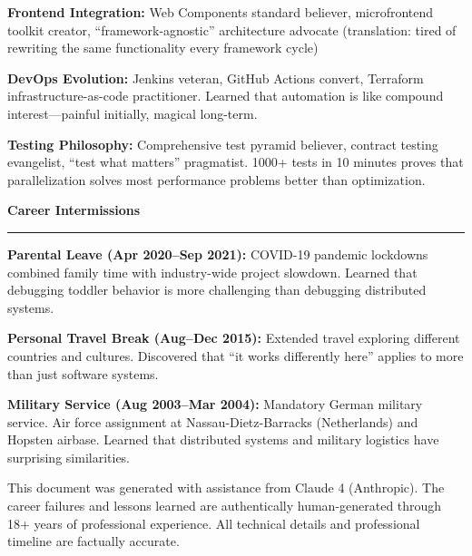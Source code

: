 \documentclass[11pt,a4paper]{article}
\newcommand{\sectionheader}[1]{
    \vspace{0.4em}
    {\Large \textbf{\textsf{\textcolor{primarycolor}{#1}}}}
    \vspace{0.2em}
    \hrule
    \vspace{0.3em}
}
\begin{document}
\textbf{Frontend Integration:} Web Components standard believer, microfrontend toolkit creator, ``framework-agnostic'' architecture advocate (translation: tired of rewriting the same functionality every framework cycle)

\textbf{DevOps Evolution:} Jenkins veteran, GitHub Actions convert, Terraform infrastructure-as-code practitioner. Learned that automation is like compound interest---painful initially, magical long-term.

\textbf{Testing Philosophy:} Comprehensive test pyramid believer, contract testing evangelist, ``test what matters'' pragmatist. 1000+ tests in 10 minutes proves that parallelization solves most performance problems better than optimization.

\sectionheader{Career Intermissions}

\textbf{Parental Leave (Apr 2020--Sep 2021):} COVID-19 pandemic lockdowns combined family time with industry-wide project slowdown. Learned that debugging toddler behavior is more challenging than debugging distributed systems.

\textbf{Personal Travel Break (Aug--Dec 2015):} Extended travel exploring different countries and cultures. Discovered that ``it works differently here'' applies to more than just software systems.

\textbf{Military Service (Aug 2003--Mar 2004):} Mandatory German military service. Air force assignment at Nassau-Dietz-Barracks (Netherlands) and Hopsten airbase. Learned that distributed systems and military logistics have surprising similarities.

\vfill

\begin{center}
\textcolor{accentcolor}{\small This document was generated with assistance from Claude 4 (Anthropic). The career failures and lessons learned are authentically human-generated through 18+ years of professional experience. All technical details and professional timeline are factually accurate.}
\end{center}
\end{document}
